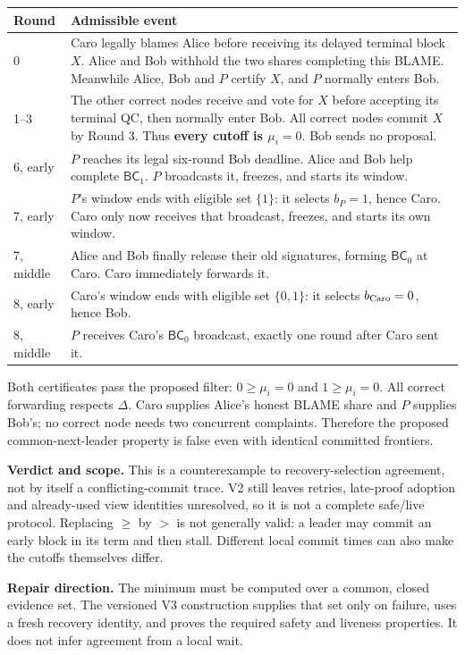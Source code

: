\documentclass[10pt,a4paper]{article}
\newcommand{\BC}{\mathsf{BC}}
\begin{document}
\begin{tabularx}{\linewidth}{@{}p{.16\linewidth}Y@{}}
\toprule
Round & Admissible event\\ & Caro legally blames Alice before receiving its delayed terminal block
$X$. Alice and Bob withhold the two shares completing this BLAME.
Meanwhile Alice, Bob and $P$ certify $X$, and $P$ normally enters Bob.\\
1--3 & The other correct nodes receive and vote for $X$ before accepting
its terminal QC, then normally enter Bob. All correct nodes commit $X$
by Round 3. Thus \textbf{every cutoff is $\mu_i=0$}. Bob sends no proposal.\\
6, early & $P$ reaches its legal six-round Bob deadline. Alice and Bob help
complete $\BC_1$. $P$ broadcasts it, freezes, and starts its window.\\
7, early & $P$'s window ends with eligible set $\{1\}$: it selects
$b_P=1$, hence Caro. Caro only now receives that broadcast, freezes,
and starts its own window.\\
7, middle & Alice and Bob finally release their old signatures, forming
$\BC_0$ at Caro. Caro immediately forwards it.\\
8, early & Caro's window ends with eligible set $\{0,1\}$: it selects
$b_{\rm Caro}=0$, hence Bob.\\
8, middle & $P$ receives Caro's $\BC_0$ broadcast, exactly one round after
Caro sent it.\\\bottomrule
\end{tabularx}

Both certificates pass the proposed filter: $0\ge\mu_i=0$ and
$1\ge\mu_i=0$. All correct forwarding respects $\Delta$. Caro supplies
Alice's honest BLAME share and $P$ supplies Bob's; no correct node needs
two concurrent complaints. Therefore the proposed common-next-leader
property is false even with identical committed frontiers.

\textbf{Verdict and scope.} This is a counterexample to recovery-selection
agreement, not by itself a conflicting-commit trace. V2 still leaves retries,
late-proof adoption and already-used view identities unresolved, so it is
not a complete safe/live protocol. Replacing $\ge$ by $>$ is not generally
valid: a leader may commit an early block in its term and then stall.
Different local commit times can also make the cutoffs themselves differ.

\textbf{Repair direction.} The minimum must be computed over a common,
closed evidence set. The versioned V3 construction supplies that set only
on failure, uses a fresh recovery identity, and proves the required safety
and liveness properties. It does not infer agreement from a local wait.
\clearpage
\end{document}
